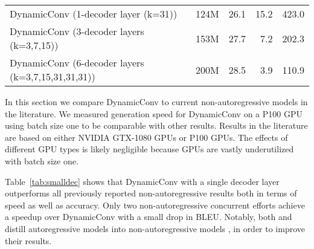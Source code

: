 \documentclass{article} \usepackage{iclr2019_conference,times}
\def\tvsdconv{DynamicConv}
\begin{document}
\begin{table*}[h]
{\begin{tabular}{ l c r r r}
\midrule
\tvsdconv{} (1-decoder layer (k=31)) & 124M & 26.1 & 15.2 & 423.0   \\
\tvsdconv{} (3-decoder layers (k=3,7,15)) & 153M & 27.7 & 7.2 & 202.3   \\
\tvsdconv{} (6-decoder layers (k=3,7,15,31,31,31)) & 200M & 28.5 & 3.9 & 110.9  \\
\bottomrule
\end{tabular}
}
\caption{Inference speed of non-autoregressive models and small decoder versions of \tvsdconv{} on WMT English-German newstest2014. For some models, the decoding speed (sent/sec) is derived by taking the inverse of the sentence generation latency in the literature.}
\label{tab:smalldec}
\end{table*}

In this section we compare \tvsdconv{} to current non-autoregressive models in the literature. 
We measured generation speed for \tvsdconv{} on a P100 GPU using batch size one to be comparable with other results.
Results in the literature are based on either NVIDIA GTX-1080 GPUs or P100 GPUs. 
The effects of different GPU types is likely negligible because GPUs are vastly underutilized with batch size one.

Table~\ref{tab:smalldec} shows that \tvsdconv{} with a single decoder layer outperforms all previously reported non-autoregressive results both in terms of speed as well as accuracy.
Only two non-autoregressive concurrent efforts \citep{guo2018non,li2019hintbased} achieve a speedup over \tvsdconv{} with a small drop in BLEU.
Notably, both \citet{guo2018non} and \citet{li2019hintbased} distill autoregressive models into non-autoregressive models \citep{hinton2015distilling}, in order to improve their results.


 
\end{document}
